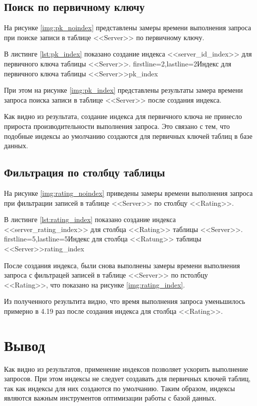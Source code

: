 \subsection{Поиск по первичному ключу}

На рисунке \ref{img:pk_noindex} представлены замеры времени выполнения запроса при поиске записи в таблице <<Server>> по первичному ключу.

В листинге \ref{lst:pk_index} показано создание индекса <<server\_id\_index>> для первичного ключа таблицы <<Server>>. 
            {firstline=2,lastline=2}{Индекс для первичного ключа таблицы <<Server>>}{pk_index}{}

При этом на рисунке \ref{img:pk_index} представлены результаты замера времени запроса поиска записи в таблице <<Server>> после создания индекса.

Как видно из результата, создание индекса для первичного ключа не принесло прироста производительности выполнения запроса. Это связано с тем, что подобные индексы ао умолчанию создаются для первичных ключей таблиц в базе данных.


\subsection{Фильтрация по столбцу таблицы}

На рисунке \ref{img:rating_noindex} приведены замеры времени выполнения запроса при фильтрации записей в таблице <<Server>> по столбцу <<Rating>>.

В листинге \ref{lst:rating_index} показано создание индекса <<server\_rating\_index>> для столбца <<Rating>> таблицы <<Server>>. 
            {firstline=5,lastline=5}{Индекс для столбца <<Ratung>> таблицы <<Server>>}{rating_index}{}

После создания индекса, были снова выполнены замеры времени выполнения запроса с фильтрацей записей в таблице <<Server>> по пстолбцу <<Rating>>, что показано на рисунке \ref{img:rating_index}.

Из полученного результита видно, что время выполнения запроса уменьшилось примерно в 4.19 раз после создания индекса для столбца <<Rating>>.


\section{Вывод}

Как видно из результатов, применение индексов позволяет ускорить выполнение запросов. При этом индексы не следует создавать для первичных ключей таблиц, так как индексы для них создаются по умолчанию. Таким образом, индексы являются важным инструментов оптимизации работы с базой данных.

